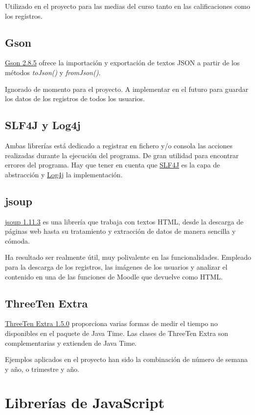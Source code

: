 Utilizado en el proyecto para las medias del curso tanto en las calificaciones como los registros.

\subsection{Gson}
\href{https://github.com/google/gson}{Gson 2.8.5} ofrece la importación y exportación de textos JSON a partir de los métodos \textit{toJson()} y \textit{fromJson()}.

Ignorado de momento para el proyecto. A implementar en el futuro para guardar los datos de los registros de todos los usuarios.

\subsection{SLF4J y Log4j}
Ambas librerías está dedicado a registrar en fichero y/o consola las acciones realizadas durante la ejecución del programa. De gran utilidad para encontrar errores del programa. 
Hay que tener en cuenta que \href{https://www.slf4j.org/}{SLF4J} es la capa de abstracción y \href{https://logging.apache.org/log4j}{Log4j} la implementación.

\subsection{jsoup}
\href{https://jsoup.org/}{jsoup 1.11.3} es una librería que trabaja con textos HTML, desde la descarga de páginas web hasta su tratamiento y extracción de datos de manera sencilla y cómoda.

Ha resultado ser realmente útil, muy polivalente en las funcionalidades. Empleado para la descarga de los registros, las imágenes de los usuarios y analizar el contenido en una de las funciones de Moodle que devuelve como HTML.

\subsection{ThreeTen Extra}
\href{https://www.threeten.org/threeten-extra/}{ThreeTen Extra 1.5.0} proporciona varias formas de medir el tiempo no disponibles en el paquete de Java Time. Las clases de ThreeTen Extra son complementarias y extienden de Java Time.

Ejemplos aplicados en el proyecto han sido la combinación de número de semana y año, o trimestre y año.

\section{Librerías de JavaScript}


